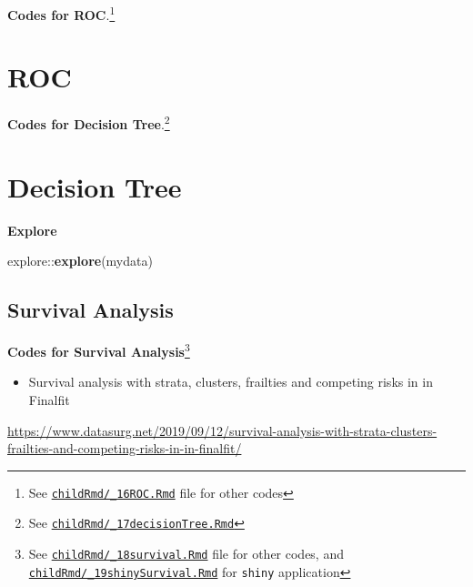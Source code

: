 \documentclass[
]{article}
\newenvironment{Shaded}{\begin{snugshade}}{\end{snugshade}}
\newcommand{\KeywordTok}[1]{\textcolor[rgb]{0.12,0.11,0.11}{\textbf{#1}}}
\newcommand{\NormalTok}[1]{\textcolor[rgb]{0.12,0.11,0.11}{#1}}
\newcommand{\OperatorTok}[1]{\textcolor[rgb]{0.12,0.11,0.11}{#1}}
\providecommand{\tightlist}{%
  \setlength{\itemsep}{0pt}\setlength{\parskip}{0pt}}
\begin{document}
\newpage
\begin{landscape}

\textbf{Codes for ROC}.\footnote{See
  \href{https://github.com/sbalci/histopathology-template/blob/master/childRmd/_16ROC.Rmd}{\texttt{childRmd/\_16ROC.Rmd}}
  file for other codes}

\hypertarget{roc}{%
\section{ROC}\label{roc}}

\textbf{Codes for Decision Tree}.\footnote{See
  \href{https://github.com/sbalci/histopathology-template/blob/master/childRmd/_17decisionTree.Rmd}{\texttt{childRmd/\_17decisionTree.Rmd}}}

\hypertarget{decision-tree}{%
\section{Decision Tree}\label{decision-tree}}

\textbf{Explore}

\begin{Shaded}
\begin{Highlighting}[]
\NormalTok{explore}\OperatorTok{::}\KeywordTok{explore}\NormalTok{(mydata)}
\end{Highlighting}
\end{Shaded}

\hypertarget{survival-analysis}{%
\subsection{Survival Analysis}\label{survival-analysis}}

\textbf{Codes for Survival Analysis}\footnote{See
  \href{https://github.com/sbalci/histopathology-template/blob/master/childRmd/_18survival.Rmd}{\texttt{childRmd/\_18survival.Rmd}}
  file for other codes, and
  \href{https://github.com/sbalci/histopathology-template/blob/master/childRmd/_19shinySurvival.Rmd}{\texttt{childRmd/\_19shinySurvival.Rmd}}
  for \texttt{shiny} application}

\begin{itemize}
\tightlist
\item
  Survival analysis with strata, clusters, frailties and competing risks
  in in Finalfit
\end{itemize}

\url{https://www.datasurg.net/2019/09/12/survival-analysis-with-strata-clusters-frailties-and-competing-risks-in-in-finalfit/}


\end{landscape}
\end{document}
